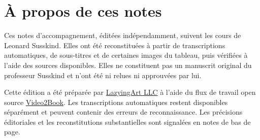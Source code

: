 \documentclass[11pt,oneside]{book}
\begin{document}
\frontmatter
\hypersetup{pageanchor=false}

\hypersetup{pageanchor=true}

\clearpage
\chapter{À propos de ces notes}
Ces notes d’accompagnement, éditées indépendamment, suivent les cours de Leonard Susskind. Elles ont été reconstituées à partir de transcriptions automatiques, de sous-titres et de certaines images du tableau, puis vérifiées à l’aide des sources disponibles. Elles ne constituent pas un manuscrit original du professeur Susskind et n’ont été ni relues ni approuvées par lui.

Cette édition a été préparée par \href{https://lazying.art}{LazyingArt LLC} à l’aide du flux de travail open source \href{https://github.com/lachlanchen/Video2Book}{Video2Book}. Les transcriptions automatiques restent disponibles séparément et peuvent contenir des erreurs de reconnaissance. Les précisions éditoriales et les reconstitutions substantielles sont signalées en notes de bas de page.
\clearpage
\tableofcontents
\mainmatter










\end{document}
